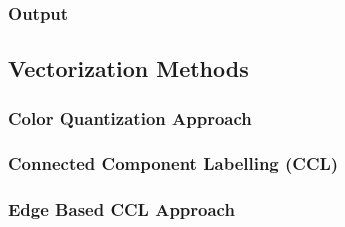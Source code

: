 \documentclass[12pt]{article}
\begin{document}
    \subsubsection{Output}\label{subsubsec:output}


    \subsection{Vectorization Methods}\label{subsec:vectorization-methods}


    \subsubsection{Color Quantization Approach}\label{subsubsec:color-quantization-approach}



    \subsubsection{Connected Component Labelling (CCL)}\label{subsubsec:connected-component-labelling-(ccl)}



    \subsubsection{Edge Based CCL Approach}\label{subsubsec:edge-based-ccl-approach}
\end{document}
